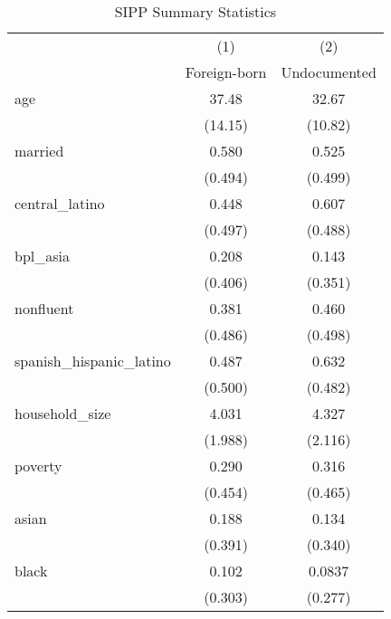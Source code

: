 \begin{table}[htbp]\centering
\def\sym#1{\ifmmode^{#1}\else\(^{#1}\)\fi}
\caption{SIPP Summary Statistics \label{tab:sum}}
\begin{tabular}{l*{2}{c}}
\hline\hline
                    &\multicolumn{1}{c}{(1)}         &\multicolumn{1}{c}{(2)}         \\
                    &Foreign-born         &Undocumented         \\
\hline
age                 &       37.48         &       32.67         \\
                    &     (14.15)         &     (10.82)         \\
[1em]
married             &       0.580         &       0.525         \\
                    &     (0.494)         &     (0.499)         \\
[1em]
central\_latino      &       0.448         &       0.607         \\
                    &     (0.497)         &     (0.488)         \\
[1em]
bpl\_asia            &       0.208         &       0.143         \\
                    &     (0.406)         &     (0.351)         \\
[1em]
nonfluent           &       0.381         &       0.460         \\
                    &     (0.486)         &     (0.498)         \\
[1em]
spanish\_hispanic\_latino&       0.487         &       0.632         \\
                    &     (0.500)         &     (0.482)         \\
[1em]
household\_size      &       4.031         &       4.327         \\
                    &     (1.988)         &     (2.116)         \\
[1em]
poverty             &       0.290         &       0.316         \\
                    &     (0.454)         &     (0.465)         \\
[1em]
asian               &       0.188         &       0.134         \\
                    &     (0.391)         &     (0.340)         \\
[1em]
black               &       0.102         &      0.0837         \\
                    &     (0.303)         &     (0.277)         \\

\end{tabular}
\end{table}
